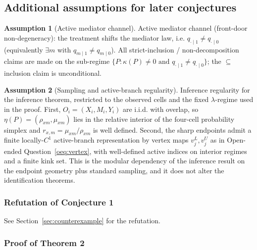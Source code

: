 \documentclass[11pt]{article}
\theoremstyle{definition}
\newtheorem{assumption}{Assumption}
\theoremstyle{plain}
\theoremstyle{remark}
\begin{document}
\subsection*{Additional assumptions for later conjectures}
\begin{assumption}[Active mediator channel]\label{ass:mediator-shift}
Active mediator channel (front-door non-degeneracy): the treatment shifts the mediator law, i.e. \(q_{\cdot\mid1}\neq q_{\cdot\mid0}\) (equivalently \(\exists m\) with \(q_{m\mid1}\neq q_{m\mid0}\)). All strict-inclusion / non-decomposition claims are made on the sub-regime \(\{P:\kappa(P)\neq 0 \text{ and } q_{\cdot\mid1}\neq q_{\cdot\mid0}\}\); the \(\subseteq\) inclusion claim is unconditional.
\end{assumption}

\begin{assumption}[Sampling and active-branch regularity]\label{ass:inference-regularity}
Inference regularity for the inference theorem, restricted to the observed cells and the fixed \(\lambda\)-regime used in the proof. First, \(O_i=(X_i,M_i,Y_i)\) are i.i.d. with overlap, so \(\eta(P)=(\rho_{xm},\mu_{xm})\) lies in the relative interior of the four-cell probability simplex and \(r_{x,m}=\mu_{xm}/\rho_{xm}\) is well defined. Second, the sharp endpoints admit a finite locally-\(C^1\) active-branch representation by vertex maps \(v_j^L,v_j^U\) as in Open-ended Question~\ref{oeq:vertex}, with well-defined active indices on interior regimes and a finite kink set. This is the modular dependency of the inference result on the endpoint geometry plus standard sampling, and it does not alter the identification theorems.
\end{assumption}

\subsubsection*{Refutation of Conjecture 1}
See Section~\ref{sec:counterexample} for the refutation.

\subsubsection*{Proof of Theorem 2}
\end{document}
